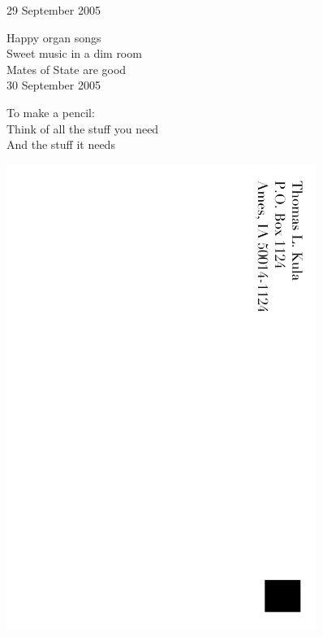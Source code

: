 \documentclass[12pt]{article}
\begin{document}
29 September 2005

Happy organ songs \\
Sweet music in a dim room \\
Mates of State are good \\

30 September 2005

To make a pencil: \\
Think of all the stuff you need \\
And the stuff it needs \\


\newpage

\includegraphics[width=101mm]{backpage.png}
\end{document}
